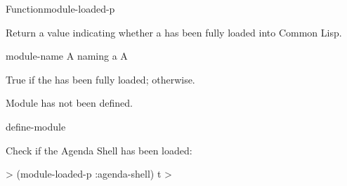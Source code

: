 \documentclass[10pt,twoside,english,pdftex]{article}
\begin{document}
\begin{functiondoc}{Function}{module-loaded-p}{
    \returns{} }
%
%

\fnsyntax 

\fnpurpose Return a value indicating whether a  has been fully
loaded into Common Lisp.

\fnpackage {}

\fnmodule {}

\fnargs
\begin{args}{module-name}
 A  naming a 
\arg[boolean] A 
\end{args}

\fnreturns True if the  has been fully loaded; \nil{} otherwise.

\fnerrors
Module  has not been defined.

\begin{alsos}{define-module}
\end{alsos}

\fnexample
Check if the Agenda Shell  has been loaded:
%
\begin{example}
\W\supp
  > (module-loaded-p :agenda-shell)
  t
  >
\end{example} 

\end{functiondoc}

\end{document}

